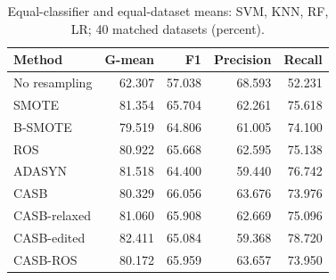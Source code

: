 \begin{table}[pos=!htbp]
\centering\small
\caption{Equal-classifier and equal-dataset means: SVM, KNN, RF, LR; 40 matched datasets (percent).}\label{tab:scores_combined}
\begin{tabular}{lrrrr}\toprule
Method & G-mean & F1 & Precision & Recall \\
\midrule
No resampling & 62.307 & 57.038 & 68.593 & 52.231 \\
SMOTE & 81.354 & 65.704 & 62.261 & 75.618 \\
B-SMOTE & 79.519 & 64.806 & 61.005 & 74.100 \\
ROS & 80.922 & 65.668 & 62.595 & 75.138 \\
ADASYN & 81.518 & 64.400 & 59.440 & 76.742 \\
CASB & 80.329 & 66.056 & 63.676 & 73.976 \\
CASB-relaxed & 81.060 & 65.908 & 62.669 & 75.096 \\
CASB-edited & 82.411 & 65.084 & 59.368 & 78.720 \\
CASB-ROS & 80.172 & 65.959 & 63.657 & 73.950 \\
\bottomrule\end{tabular}
\end{table}
